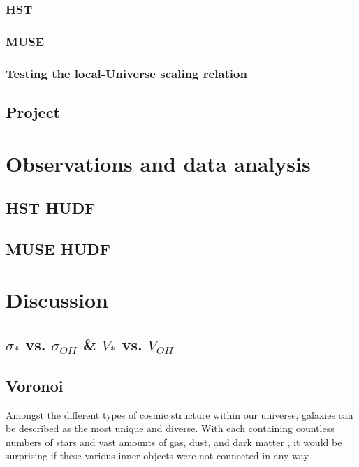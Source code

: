 \documentclass[12pt, twocolumn]{revtex4}    %
\begin{document}
\subsubsection{HST}

\subsubsection{MUSE}

\subsubsection{Testing the local-Universe scaling relation}

\subsection{Project} %

\section{Observations and data analysis}

\subsection{HST HUDF}

\subsection{MUSE HUDF}

\section{Discussion}

\subsection{$\sigma_{*}$ vs. $\sigma_{OII}$ \& $V_{*}$ vs. $V_{OII}$}

\subsection{Voronoi}

Amongst the different types of cosmic structure within our universe, galaxies can be described as the most unique and diverse. With each containing countless numbers of stars and vast amounts of gas, dust, and dark matter \citep{carroll_astro}, it would be surprising if these various inner objects were not connected in any way.
\end{document}
